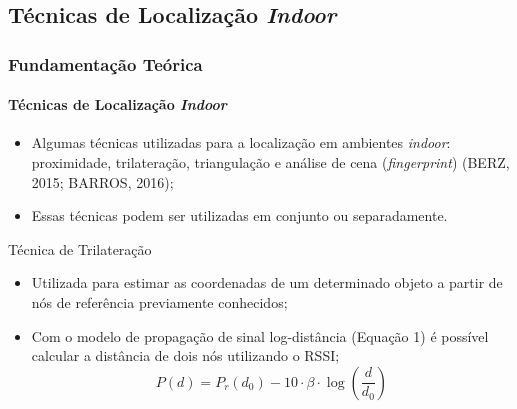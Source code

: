 \documentclass[xcolor={dvipsnames,svgnames,table}]{beamer}
\begin{document}
	\subsection{Técnicas de Localização \textit{Indoor}}
	\label{fundamentacao-tecnicas-localizao-indoor}
	\begin{frame}
		\frametitle{Fundamentação Teórica}
		\framesubtitle{Técnicas de Localização \textit{Indoor}}
		\begin{itemize}[label=\textcolor{black}{\textbullet}, left=0pt]
			\justifying
			\item {\footnotesize Algumas técnicas utilizadas para a localização em ambientes \textit{indoor}: proximidade, trilateração, triangulação e análise de cena (\textit{fingerprint}) (BERZ, 2015; BARROS, 2016);}
			\item {\footnotesize Essas técnicas podem ser utilizadas em conjunto ou separadamente.} 
		\end{itemize}	
		\begin{block}{Técnica de Trilateração}
			\begin{itemize}[label=\textcolor{black}{\textbullet}, left=5pt]
				\justifying
				\item Utilizada para estimar as coordenadas de um determinado objeto a partir de nós de referência previamente conhecidos;
				\item Com o modelo de propagação de sinal log-distância (Equação 1) é possível calcular a distância de dois nós utilizando o RSSI;
				\begin{equation}
					\label{equacao-log-distancia}
					P(d) = P_r(d_0) - 10\cdot\beta\cdot\log\left(\frac{d}{d_0}\right)
				\end{equation}
			\end{itemize}
		\end{block}		
	\end{frame}
	
\end{document}
